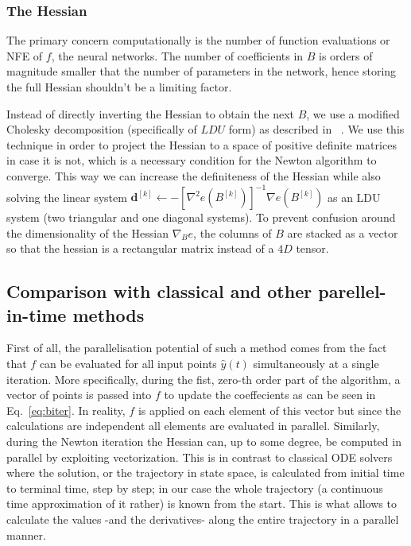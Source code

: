 \documentclass[11pt]{report}
\begin{document}
    \subsubsection{The Hessian}

    The primary concern computationally is the number of function evaluations or NFE of $f$,
    the neural networks.
    The number of coefficients in $B$ is orders of magnitude smaller that the number of parameters in the network,
    hence storing the full Hessian shouldn't be a limiting factor.

    Instead of directly inverting the Hessian to obtain the next $B$, we use a modified Cholesky decomposition
    (specifically of $LDU$ form) as described in ~\cite{gill2019practical}.
    We use this technique in order to project the Hessian to a space of positive definite matrices in case it is not,
    which is a necessary condition for the Newton algorithm to converge.
    This way we can increase the definiteness of the Hessian while also solving the linear system
    $\pmb{d}^{[k]} \gets -\left[ \nabla^2 e(B^{[k]}) \right]^{-1} \nabla e(B^{[k]})$ as an LDU system (two triangular
    and one diagonal systems).
    To prevent confusion around the dimensionality of the Hessian $\nabla_{B} e$,
    the columns of $B$ are stacked as a vector so that the hessian is a rectangular matrix instead of a $4D$ tensor.

    \subsection{Comparison with classical and other parellel-in-time methods}
    First of all, the parallelisation potential of such a method comes from the fact that $f$ can be evaluated for all
    input points $\hat y(t)$ simultaneously at a single iteration.
    More specifically, during the fist, zero-th order part of the algorithm, a vector of points is passed into $f$ to
    update the coeffecients as can be seen in Eq.~\eqref{eq:biter}.
    In reality, $f$ is applied on each element of this vector but since the calculations are independent all elements are
    evaluated in parallel.
    Similarly, during the Newton iteration the Hessian can, up to some degree, be computed in parallel by exploiting
    vectorization.
    This is in contrast to classical ODE solvers where the solution, or the trajectory in state space, is calculated from
    initial time to terminal time, step by step; in our case the whole trajectory (a continuous time approximation
    of it rather) is known from the start.
    This is what allows to calculate the values -and the derivatives- along the entire trajectory in a parallel manner.
\end{document}
